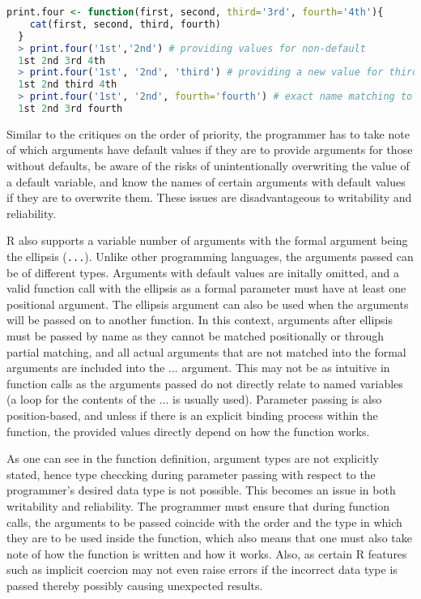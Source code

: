 \documentclass[12pt]{article}
\begin{document}
\begin{lstlisting}[language=R, frame=none]
  print.four <- function(first, second, third='3rd', fourth='4th'){
    cat(first, second, third, fourth)
  }
  > print.four('1st','2nd') # providing values for non-default
  1st 2nd 3rd 4th
  > print.four('1st', '2nd', 'third') # providing a new value for third
  1st 2nd third 4th
  > print.four('1st', '2nd', fourth='fourth') # exact name matching to fourth
  1st 2nd 3rd fourth
\end{lstlisting}

Similar to the critiques on the order of priority, the programmer has to take note of which arguments have default values if they are to provide arguments for those without defaults, be aware of the risks of unintentionally overwriting the value of a default variable, and know the names of certain arguments with default values if they are to overwrite them. These issues are disadvantageous to writability and reliability.

R also supports a variable number of arguments with the formal argument being the ellipsis (\texttt{...}). Unlike other programming languages, the arguments passed can be of different types. Arguments with default values are initally omitted, and a valid function call with the ellipsis as a formal parameter must have at least one positional argument. The ellipsis argument can also be used when the arguments will be passed on to another function. In this context, arguments after ellipsis must be passed by name as they cannot be matched positionally or through partial matching, and all actual arguments that are not matched into the formal arguments are included into the ... argument. This may not be as intuitive in function calls as the arguments passed do not directly relate to named variables (a loop for the contents of the ... is usually used). Parameter passing is also position-based, and unless if there is an explicit binding process within the function, the provided values directly depend on how the function works.

As one can see in the function definition, argument types are not explicitly stated, hence type checcking during parameter passing with respect to the programmer's desired data type is not possible. This becomes an issue in both writability and reliability. The programmer must ensure that during function calls, the arguments to be passed coincide with the order and the type in which they are to be used inside the function, which also means that one must also take note of how the function is written and how it works. Also, as certain R features such as implicit coercion may not even raise errors if the incorrect data type is passed thereby possibly causing unexpected results.
\end{document}
